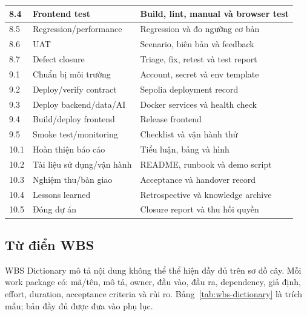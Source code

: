 \begin{longtable}{| p{1.2cm} | p{4.9cm} | p{6.7cm} |}
8.4 & Frontend test & Build, lint, manual và browser test \\ \hline
8.5 & Regression/performance & Regression và đo ngưỡng cơ bản \\ \hline
8.6 & UAT & Scenario, biên bản và feedback \\ \hline
8.7 & Defect closure & Triage, fix, retest và test report \\
\hline
9.1 & Chuẩn bị môi trường & Account, secret và env template \\ \hline
9.2 & Deploy/verify contract & Sepolia deployment record \\ \hline
9.3 & Deploy backend/data/AI & Docker services và health check \\ \hline
9.4 & Build/deploy frontend & Release frontend \\ \hline
9.5 & Smoke test/monitoring & Checklist và vận hành thử \\
\hline
10.1 & Hoàn thiện báo cáo & Tiểu luận, bảng và hình \\ \hline
10.2 & Tài liệu sử dụng/vận hành & README, runbook và demo script \\ \hline
10.3 & Nghiệm thu/bàn giao & Acceptance và handover record \\ \hline
10.4 & Lessons learned & Retrospective và knowledge archive \\ \hline
10.5 & Đóng dự án & Closure report và thu hồi quyền \\
\hline
\end{longtable}

\subsection{Từ điển WBS}

WBS Dictionary mô tả nội dung không thể thể hiện đầy đủ trên sơ đồ cây. Mỗi work package có: mã/tên, mô tả, owner, đầu vào, đầu ra, dependency, giả định, effort, duration, acceptance criteria và rủi ro. Bảng~\ref{tab:wbs-dictionary} là trích mẫu; bản đầy đủ được đưa vào phụ lục.

